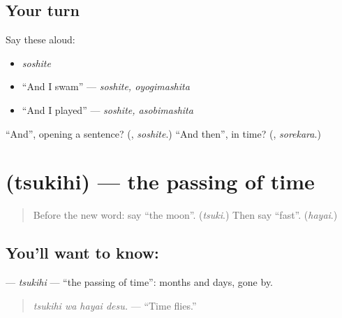 \subsection*{Your turn}
Say these aloud:

\begin{itemize}
\raggedright
  \item \emph{soshite}
  \item \textquotedblleft{}And I swam\textquotedblright{} — \emph{soshite, oyogimashita}
  \item \textquotedblleft{}And I played\textquotedblright{} — \emph{soshite, asobimashita}
\end{itemize}

\begin{tcolorbox}[breakable,colback=teal!4,colframe=teal!35!black,title={Before you move on}]
\textquotedblleft{}And\textquotedblright{}, opening a sentence? (\textbf{}, \emph{soshite}.) \textquotedblleft{}And then\textquotedblright{}, in time? (\textbf{}, \emph{sorekara}.)
\end{tcolorbox}
\section[\texorpdfstring{\ja{月日} (tsukihi)}{月日 (tsukihi)}]{ (tsukihi) — the passing of time}

\label{lesson:JA-C252-tsukihi}



\begin{quote}
Before the new word: say \textquotedblleft{}the moon\textquotedblright{}. (\emph{tsuki}.) Then say \textquotedblleft{}fast\textquotedblright{}. (\emph{hayai}.)
\end{quote}

\subsection*{You'll want to know: }
\textbf{} — \emph{tsukihi} — \textquotedblleft{}the passing of time\textquotedblright{}: months and days, gone by.

\begin{quote}
\textbf{ }
\end{quote}

\begin{quote}
\emph{tsukihi wa hayai desu.} — \textquotedblleft{}Time flies.\textquotedblright{}
\end{quote}


